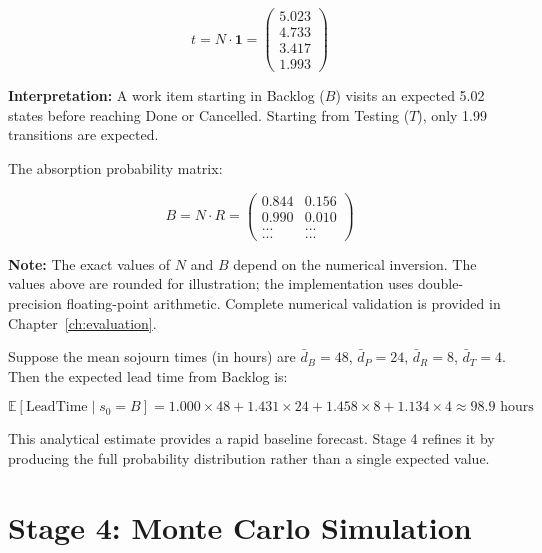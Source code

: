 \begin{equation}
\label{eq:example-t}
t = N \cdot \mathbf{1} = \begin{pmatrix}
5.023 \\ 4.733 \\ 3.417 \\ 1.993
\end{pmatrix}
\end{equation}

\textbf{Interpretation:} A work item starting in Backlog ($B$) visits an 
expected 5.02 states before reaching Done or Cancelled. Starting from 
Testing ($T$), only 1.99 transitions are expected.

The absorption probability matrix:

\begin{equation}
\label{eq:example-B}
B = N \cdot R = \begin{pmatrix}
0.844 & 0.156 \\
0.990 & 0.010 \\
... & ... \\
... & ...
\end{pmatrix}
\end{equation}

\textbf{Note:} The exact values of $N$ and $B$ depend on the numerical 
inversion. The values above are rounded for illustration; the 
implementation uses double-precision floating-point arithmetic. 
Complete numerical validation is provided in Chapter~\ref{ch:evaluation}.

Suppose the mean sojourn times (in hours) are $\bar{d}_B = 48$, 
$\bar{d}_P = 24$, $\bar{d}_R = 8$, $\bar{d}_T = 4$. Then the expected 
lead time from Backlog is:

\begin{equation}
\label{eq:example-lead-time}
\mathbb{E}[\text{LeadTime} \mid s_0 = B] = 
    1.000 \times 48 + 1.431 \times 24 + 1.458 \times 8 + 1.134 \times 4 
    \approx 98.9 \text{ hours}
\end{equation}

This analytical estimate provides a rapid baseline forecast. Stage 4 
refines it by producing the full probability distribution rather than 
a single expected value.


\section{Stage 4: Monte Carlo Simulation}
\label{sec:stage4}

